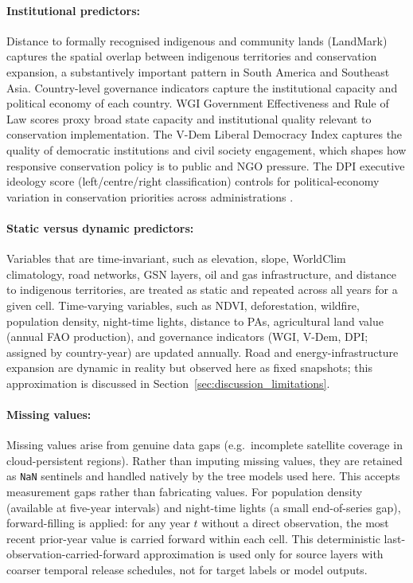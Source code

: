 \documentclass[12pt]{article}
\theoremstyle{break}
\begin{document}
\paragraph{Institutional predictors:}
Distance to formally recognised indigenous and community lands (LandMark) captures
the spatial overlap between indigenous territories and conservation expansion, a
substantively important pattern in South America and Southeast Asia. Country-level
governance indicators capture the institutional capacity and political economy of
each country. WGI Government Effectiveness and Rule of Law scores proxy broad state
capacity and institutional quality relevant to conservation implementation. The
V-Dem Liberal Democracy Index
captures the quality of democratic institutions and civil society engagement, which
shapes how responsive conservation policy is to public and NGO pressure. The DPI
executive ideology score (left/centre/right classification) controls for
political-economy variation in conservation priorities across administrations \citep{wangsun2022}.

\paragraph{Static versus dynamic predictors:}
Variables that are time-invariant, such as elevation, slope, WorldClim climatology, road
networks, GSN layers, oil and gas infrastructure, and distance to indigenous territories,
are treated as static and repeated across all years for a given cell. Time-varying
variables, such as NDVI, deforestation, wildfire, population density, night-time lights,
distance to PAs, agricultural land value (annual FAO production), and governance
indicators (WGI, V-Dem, DPI; assigned by country-year) are updated annually. Road and
energy-infrastructure expansion are dynamic in reality but observed here as fixed
snapshots; this approximation is discussed in Section~\ref{sec:discussion_limitations}.

\paragraph{Missing values:}
Missing values arise from genuine data gaps (e.g.\ incomplete satellite coverage in
cloud-persistent regions). Rather than imputing missing values, they are retained as
\texttt{NaN} sentinels and handled natively by the tree models used
here. This accepts measurement gaps rather than fabricating values. For population
density (available at five-year intervals) and night-time lights (a small
end-of-series gap), forward-filling is applied: for any year $t$ without a direct
observation, the most recent prior-year value is carried forward within each cell.
This deterministic last-observation-carried-forward approximation \citep{little2019}
is used only for source layers with coarser temporal release schedules, not for target
labels or model outputs.
\end{document}
